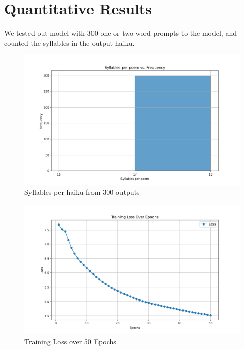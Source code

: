 \documentclass{article} %
\begin{document}
\section{Quantitative Results}

We tested out model with 300 one or two word prompts to the model, and counted the syllables in the output haiku.

\begin{figure}[h]
  \begin{center}
  \includegraphics[width=1\textwidth]{Figs/syllable_count_last_word-1.png}
  \end{center}
  \caption{Syllables per haiku from 300 outputs}
  \label{fig:plot1}
\end{figure}

\begin{figure}[h]
  \begin{center}
  \includegraphics[width=1\textwidth]{Figs/loss-vs-epochs-2.png}
  \end{center}
  \caption{Training Loss over 50 Epochs}
  \label{fig:lossvepochs}
\end{figure}
\end{document}
